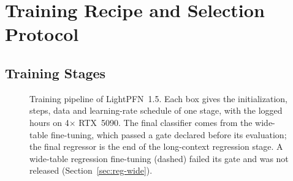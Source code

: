 \documentclass[11pt]{article}
\begin{document}
\section{Training Recipe and Selection Protocol}
\label{sec:training}

\subsection{Training Stages}
\label{sec:schedule}

\begin{figure}[tbp]
\centering
\resizebox{\linewidth}{!}{}
\caption{Training pipeline of LightPFN~1.5. Each box gives the initialization, steps, data and learning-rate schedule of one stage, with the logged hours on 4$\times$ RTX~5090. The final classifier comes from the wide-table fine-tuning, which passed a gate declared before its evaluation; the final regressor is the end of the long-context regression stage. A wide-table regression fine-tuning (dashed) failed its gate and was not released (Section~\ref{sec:reg-wide}).}
\label{fig:stages}
\end{figure}
\end{document}
